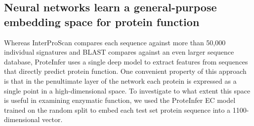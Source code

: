 \subsection*{Neural networks learn a general-purpose embedding space for protein function}
Whereas InterProScan compares each sequence against more than 50,000 %
individual signatures and BLAST compares against an even larger sequence database, ProteInfer uses a single deep model to extract features from sequences that directly predict protein function. One convenient property of this approach is that in the penultimate layer of the network each protein is expressed as a single point in a high-dimensional space. To investigate to what extent this space is useful in examining enzymatic function, we used the ProteInfer EC model trained on the random split to embed each test set protein sequence into a 1100-dimensional vector. 


